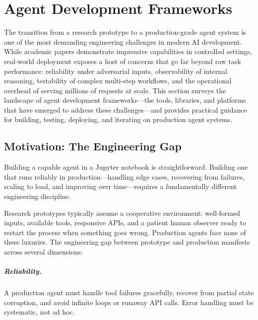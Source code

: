 \chapter{Agent Development Frameworks}
\label{sec:agent-development-frameworks}

The transition from a research prototype to a production-grade agent system is one of the most demanding engineering challenges in modern AI development. While academic papers demonstrate impressive capabilities in controlled settings, real-world deployment exposes a host of concerns that go far beyond raw task performance: reliability under adversarial inputs, observability of internal reasoning, testability of complex multi-step workflows, and the operational overhead of serving millions of requests at scale. This section surveys the landscape of agent development frameworks---the tools, libraries, and platforms that have emerged to address these challenges---and provides practical guidance for building, testing, deploying, and iterating on production agent systems.

\section{Motivation: The Engineering Gap}
\label{subsec:engineering-gap}

\begin{keybox}
Building a capable agent in a Jupyter notebook is straightforward. Building one that runs reliably in production---handling edge cases, recovering from failures, scaling to load, and improving over time---requires a fundamentally different engineering discipline.
\end{keybox}

Research prototypes typically assume a cooperative environment: well-formed inputs, available tools, responsive APIs, and a patient human observer ready to restart the process when something goes wrong. Production agents face none of these luxuries. The engineering gap between prototype and production manifests across several dimensions:

\paragraph{Reliability.}
\label{reliability.}

A production agent must handle tool failures gracefully, recover from partial state corruption, and avoid infinite loops or runaway API calls. Error handling must be systematic, not ad hoc.

